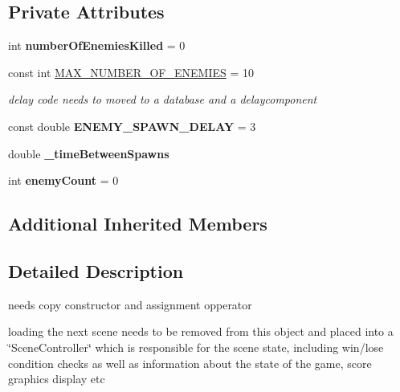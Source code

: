 \subsection*{Private Attributes}
\begin{DoxyCompactItemize}
\item 
\mbox{\label{class_enemy_controller_a6d275f518464e59e77a1870c5032fb28}} 
int {\bfseries number\+Of\+Enemies\+Killed} = 0
\item 
\mbox{\label{class_enemy_controller_a6a1e1d9a6da84fe5ed2896e83767782f}} 
const int \hyperlink{class_enemy_controller_a6a1e1d9a6da84fe5ed2896e83767782f}{M\+A\+X\+\_\+\+N\+U\+M\+B\+E\+R\+\_\+\+O\+F\+\_\+\+E\+N\+E\+M\+I\+ES} = 10
\begin{DoxyCompactList}\small\item\em delay code needs to moved to a database and a delaycomponent \end{DoxyCompactList}\item 
\mbox{\label{class_enemy_controller_a99ae7c9259c27e9cd74e0b6c1b471ad9}} 
const double {\bfseries E\+N\+E\+M\+Y\+\_\+\+S\+P\+A\+W\+N\+\_\+\+D\+E\+L\+AY} = 3
\item 
\mbox{\label{class_enemy_controller_a66c173677d7d1f157877f0d273050c40}} 
double {\bfseries \+\_\+time\+Between\+Spawns}
\item 
\mbox{\label{class_enemy_controller_a64e8ff5b6342971e836389ce80bfd247}} 
int {\bfseries enemy\+Count} = 0
\end{DoxyCompactItemize}
\subsection*{Additional Inherited Members}


\subsection{Detailed Description}
needs copy constructor and assignment opperator 

loading the next scene needs to be removed from this object and placed into a \char`\"{}\+Scene\+Controller\char`\"{} which is responsible for the scene state, including win/lose condition checks as well as information about the state of the game, score graphics display etc 

